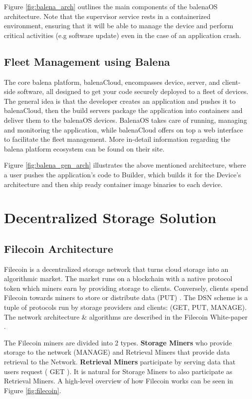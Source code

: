 Figure \ref{fig:balena_arch} outlines the main components of the balenaOS architecture. Note that the supervisor service rests in a containerized environment, ensuring that it will be able to manage the device and perform critical activities (e.g software update) even in the case of an application crash.

\subsection{Fleet Management using Balena}

The core balena platform, balenaCloud, encompasses device, server, and client-side software, all designed to get your code securely deployed to a fleet of devices. The general idea is that the developer creates an application and pushes it to balenaCloud, then the build servers package the application into containers and deliver them to the balenaOS devices. BalenaOS takes care of running, managing and monitoring the application, while balenaCloud offers on top a web interface to facilitate the fleet management. More in-detail information regarding the balena platform ecosystem can be found on their site\cite{balena}.

Figure \ref{fig:balena_gen_arch} illustrates the above mentioned architecture, where a user pushes the application's code to Builder, which builds it for the Device’s architecture and then ship ready container image binaries to each device.

\section{Decentralized Storage Solution} \label{st:filecoin}

\subsection{Filecoin Architecture} 

Filecoin is a decentralized storage network that turns cloud storage into an algorithmic market. The market runs on a blockchain with a native protocol token which miners earn by providing storage to clients. Conversely, clients spend Filecoin towards miners to store or distribute data (PUT) . The DSN scheme is a tuple of protocols run by storage providers and clients: (GET, PUT, MANAGE). The network architecture \& algorithms are described in the Filecoin White-paper \cite{filecoin-whitepaper}.
 
The Filecoin miners are divided into 2 types. \textbf{Storage Miners} who provide storage to the network (MANAGE) and Retrieval Miners that provide data retrieval to the Network. \textbf{Retrieval Miners} participate by serving data that users request ( GET ). It is natural for Storage Miners to also participate as Retrieval Miners. A high-level overview of how Filecoin works can be seen in Figure \ref{fig:filecoin}.


